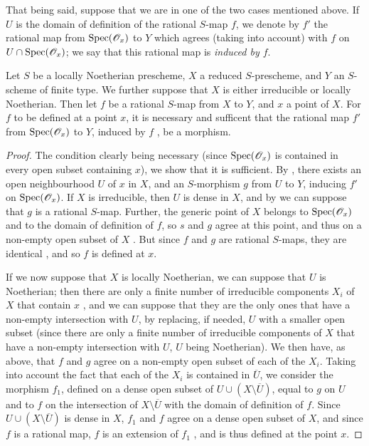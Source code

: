 That being said, suppose that we are in one of the two cases mentioned above.
If $U$ is the domain of definition of the rational $S$-map $f$, we denote by $f'$ the rational map from ${\mathop{\mathrm{Spec}}\nolimits}(\mathscr{O}_x)$ to $Y$ which agrees (taking  into account) with $f$ on $U\cap{\mathop{\mathrm{Spec}}\nolimits}(\mathscr{O}_x)$; we say that this rational map is \emph{induced by $f$}.

\begin{prop}[7.2.9]
\label{1.7.2.9}
Let $S$ be a locally Noetherian prescheme, $X$ a reduced $S$-prescheme, and $Y$ an $S$-scheme of finite type.
We further suppose that $X$ is either irreducible or locally Noetherian.
Then let $f$ be a rational $S$-map from $X$ to $Y$, and $x$ a point of $X$.
For $f$ to be defined at a point $x$, it is necessary and sufficent that the rational map $f'$ from ${\mathop{\mathrm{Spec}}\nolimits}(\mathscr{O}_x)$ to $Y$, induced by $f$ , be a morphism.
\end{prop}

\begin{proof}
\label{proof-1.7.2.9}
The condition clearly being necessary (since ${\mathop{\mathrm{Spec}}\nolimits}(\mathscr{O}_x)$ is contained in every open subset containing $x$), we show that it is sufficient.
By , there exists an open neighbourhood $U$ of $x$ in $X$, and an $S$-morphism $g$ from $U$ to $Y$, inducing $f'$ on ${\mathop{\mathrm{Spec}}\nolimits}(\mathscr{O}_x)$.
If $X$ is irreducible, then $U$ is dense in $X$, and by  we can suppose that $g$ is a rational $S$-map.
Further, the generic point of $X$ belongs to ${\mathop{\mathrm{Spec}}\nolimits}(\mathscr{O}_x)$ and to the domain of definition of $f$, so $s$ and $g$ agree at this point, and thus on a non-empty open subset of $X$ .
But since $f$ and $g$ are rational $S$-maps, they are identical , and so $f$ is defined at $x$.

If we now suppose that $X$ is locally Noetherian, we can suppose that $U$ is Noetherian; then there are only a finite number of irreducible components $X_i$ of $X$ that contain $x$ , and we can suppose that they are the only ones that have a non-empty intersection with $U$, by replacing, if needed, $U$ with a smaller open subset (since there are only a finite number of irreducible components of $X$ that have a non-empty intersection with $U$, $U$ being Noetherian).
We then have, as above, that $f$ and $g$ agree on a non-empty open subset of each of the $X_i$.
Taking into account the fact that each of the $X_i$ is contained in $\overline{U}$, we consider the morphism $f_1$, defined on a dense open subset of $U\cup(X\setminus\overline{U})$, equal to $g$ on $U$ and to $f$ on the intersection of $X\setminus\overline{U}$ with the domain of definition of $f$.
Since $U\cup(X\setminus\overline{U})$ is dense in $X$, $f_1$ and $f$ agree on a dense open subset of $X$, and since $f$ is a rational map, $f$ is an extension of $f_1$ , and is thus defined at the point $x$.
\end{proof}


